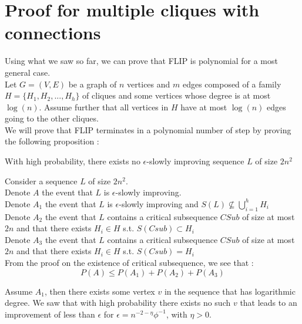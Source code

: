 \section{Proof for multiple cliques with connections}
\label{strongResult}
Using what we saw so far, we can prove that FLIP is polynomial for a most general case. \\
Let $G = (V,E)$ be a graph of $n$ vertices and $m$ edges composed of a family $H = \{H_1, H_2,..., H_h\}$ of cliques and some vertices whose degree is at most $\log(n)$. Assume further that all vertices in $H$ have at most $\log(n)$ edges going to the other cliques.\\
We will prove that FLIP terminates in a polynomial number of step by proving the following proposition :
\begin{proposition}
With high probability, there exists no $\epsilon$-slowly improving sequence $L$ of size $2n^2$
\end{proposition}

Consider a sequence $L$ of size $2n^2$.\\
Denote $A$ the event that $L$ is $\epsilon$-slowly improving.\\
Denote $A_1$ the event that $L$ is $\epsilon$-slowly improving and $S(L) \not\subseteq \bigcup_{i = 1}^{h}H_i$\\
Denote $A_2$ the event that $L$ contains a critical subsequence $CSub$ of size at most $2n$ and that there exists $H_i \in H$ s.t. $ S(Csub) \subset H_i$ \\
Denote $A_3$ the event that $L$ contains a critical subsequence $CSub$ of size at most $2n$ and that there exists $H_i \in H$ s.t. $ S(Csub) = H_i$\\

From the proof on the existence of critical subsequence, we see that :
\begin{equation*}
P(A) \leq P(A_1) + P(A_2) + P(A_3)
\end{equation*}
 
Assume $A_1$, then there exists some vertex $v$ in the sequence that has logarithmic degree. We saw that with high probability there exists no such $v$ that leads to an improvement of less than $\epsilon$ for $\epsilon = n^{-2-\eta}\phi^{-1}$, with $\eta > 0$.\\

